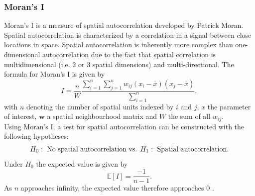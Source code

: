 \subsubsection{Moran's I}\label{sec:moran}
Moran's I is a measure of spatial autocorrelation developed by Patrick Moran. Spatial autocorrelation is characterized by a correlation in a signal between close locations in space. Spatial autocorrelation is inherently more complex than one-dimensional autocorrelation due to the fact that spatial correlation is multidimensional (i.e. 2 or 3 spatial dimensions) and multi-directional. The formula for Moran's I is given by
\begin{equation}
    I = \frac{n}{W}\frac{\sum_{i=1}^n\sum_{j=1}^nw_{ij}\left(x_i-\overline{x}\right)\left(x_j-\overline{x}\right)}{\sum_{i=1}^n},
\end{equation}
with $n$ denoting the number of spatial units indexed by $i$ and $j$, $x$ the parameter of interest, $\pmb{w}$ a spatial neighbourhood matrix and $W$ the sum of all $w_{ij}$. \\
Using Moran's I, a test for spatial autocorrelation can be constructed with the following hypotheses:
\begin{align}
    H_0:\hbox{ No spatial autocorrelation} \hbox{ vs. }  H_1:\hbox{ Spatial autocorrelation}.
\end{align}
Under $H_0$ the expected value is given by
\begin{equation}
    \mathbb{E}\left[I\right]=\frac{-1}{n-1}.
\end{equation}
As $n$ approaches infinity, the expected value therefore approaches 0 \autocite[][]{moran1950notes}.
